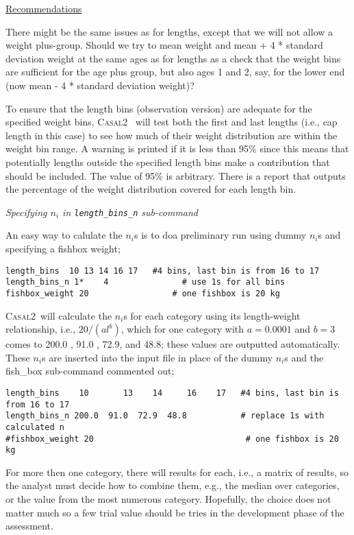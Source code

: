 \documentclass[a4paper,11pt,twoside,pdftex,draft]{article}
\newcommand{\CNAME}{\textsc{Casal2}}
\begin{document}
\bigskip
\underline{Recommendations}

There might be the same issues as for lengths, except that we will not allow a weight plus-group. Should we try to mean weight and mean + 4 * standard deviation weight at the same ages as for lengths as a check that the weight bins are sufficient for the age plus group, but also ages 1 and 2, say, for the lower end (now mean - 4 * standard deviation weight)?


To ensure that the length bins (observation version) are adequate for the specified weight bins, \CNAME~ will test both the first and last lengths (i.e., cap length in this case) to see how much of their weight distribution are within the weight bin range. A warning is printed if it is less than 95\% since this means that potentially lengths outside the specified length bins make a contribution that should be included. The value of 95\% is arbitrary. There is a report that outputs the percentage of the weight distribution covered for each length bin. 

\emph{Specifying $n_{i}$ in \texttt{length\_bins\_n} sub-command}

An easy way to calulate the $n_{i}$s is to doa preliminary run using dummy $n_{i}$s and specifying a fishbox weight; 
{\small{\begin{verbatim}
length_bins  10 13 14 16 17   #4 bins, last bin is from 16 to 17
length_bins_n 1*	4            	# use 1s for all bins
fishbox_weight 20                 # one fishbox is 20 kg
\end{verbatim}}}
\CNAME~will calculate the $n_{i}$s for each category using its length-weight relationship, i.e., $20/(al^{b})$, which for one category with $a = 0.0001$ and $b = 3$ comes to 200.0 , 91.0 , 72.9, and  48.8; these values are outputted automatically. These $n_{i}$s are inserted into the input file in place of the dummy $n_{i}$s and the fish\_box sub-command commented out;
{\small{\begin{verbatim}
length_bins    10       13    14     16    17   #4 bins, last bin is from 16 to 17
length_bins_n 200.0  91.0  72.9  48.8       	# replace 1s with calculated n
#fishbox_weight 20                               # one fishbox is 20 kg
\end{verbatim}}}

For more then one category, there will results for each, i.e., a matrix of results, so the analyst must decide how to combine them, e.g., the median over categories, or the value from the most numerous category. Hopefully, the choice does not matter much so a few trial value should be tries in the development phase of the assessment.
\end{document}
